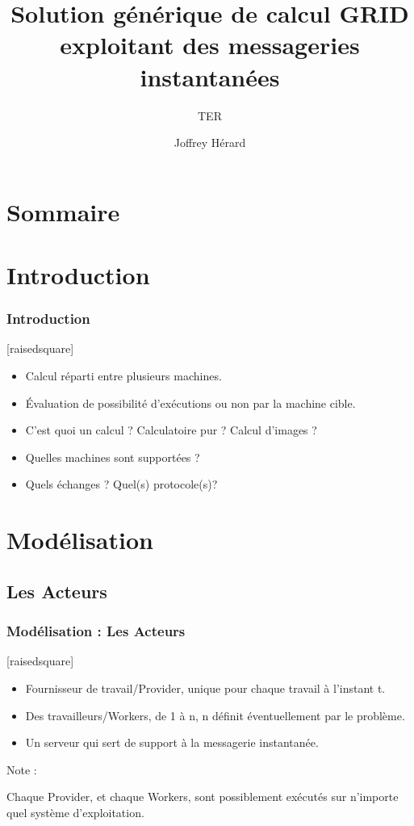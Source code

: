 \documentclass[slidetop,11pt]{beamer}
\title{Solution générique de calcul GRID exploitant des messageries instantanées}
\subtitle{TER}
\author{Joffrey Hérard}
\date{\oldstylenums{28 Mars 2017}}
\begin{document}

\frame{\titlepage}
%
\section*{Sommaire}
%

\section[Introduction]{Introduction}
\begin{frame}[label=debut]
\frametitle{Introduction}
[raisedsquare]
\begin{itemize}
\item Calcul réparti entre plusieurs machines.
\item Évaluation de possibilité d'exécutions ou non par la machine cible.
\item C'est quoi un calcul ? Calculatoire pur ? Calcul d'images ?
\item Quelles machines sont supportées ? 
\item Quels échanges ? Quel(s) protocole(s)?
\end{itemize}
\end{frame}

\section[Modélisation]{Modélisation}
\subsection[Les Acteurs]{Les Acteurs}
\begin{frame}[label=acteurs,fragile]
\frametitle{Modélisation : Les Acteurs}

[raisedsquare]
\begin{itemize}
\item Fournisseur de travail/Provider, unique pour chaque travail à l'instant t.
\item Des travailleurs/Workers, de 1 à n, n définit éventuellement par le problème.
\item Un serveur qui sert de support à la messagerie instantanée.	

\end{itemize}

\begin{exampleblock}{Note :}
 
Chaque Provider, et chaque Workers, sont possiblement exécutés sur n'importe quel système d'exploitation. 
 \end{exampleblock}
\end{frame}
\end{document}
